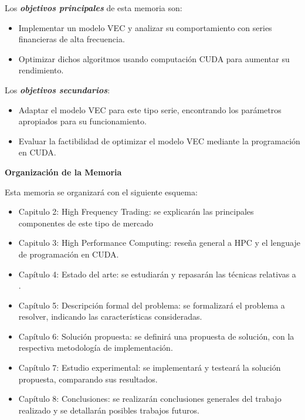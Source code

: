 Los \emph{\textbf{objetivos principales}} de esta memoria son:
\begin{itemize}
	\item Implementar un modelo VEC y analizar su comportamiento con
series financieras de alta frecuencia.
	\item Optimizar dichos algoritmos usando computación CUDA para aumentar su rendimiento.
\end{itemize} 

Los \emph{\textbf{objetivos secundarios}}:
\begin{itemize}
	\item Adaptar el modelo VEC para este tipo serie, encontrando
los parámetros apropiados para su funcionamiento.
	\item Evaluar la factibilidad de optimizar el modelo VEC mediante la programación en CUDA.
\end{itemize}


\textbf{Organización de la Memoria}

Esta memoria se organizará con el siguiente esquema:
\begin{itemize}
    \item Capitulo 2: High Frequency Trading: se explicarán las principales
    componentes de este tipo de mercado
	\item Capitulo 3: High Performance Computing: reseña general a HPC y el 
	lenguaje de programación en CUDA.
    \item Capítulo 4: Estado del arte: se estudiarán y repasarán las técnicas
    relativas a .
    \item Capítulo 5: Descripción formal del problema: se formalizará el
    problema a resolver, indicando las características consideradas.
    \item Capítulo 6: Solución propuesta: se definirá una propuesta de
    solución, con la respectiva metodología de implementación. 
    \item Capítulo 7: Estudio experimental: se implementará y testeará la
    solución propuesta, comparando sus resultados.
    \item Capítulo 8: Conclusiones: se realizarán conclusiones generales del
    trabajo realizado y se detallarán posibles trabajos futuros.
\end{itemize}
